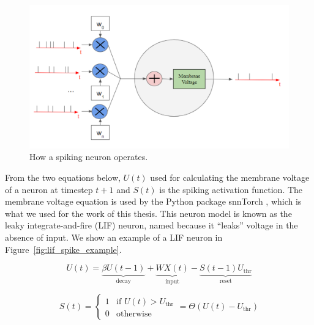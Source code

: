 \documentclass [MS] {UCLAthesis}
\begin{document}
\begin{figure}
    \centering
    \includegraphics[width=\textwidth]{neuron_snn}
    \caption[Spiking neuron model]{How a spiking neuron operates.}
    \label{fig:neuron_snn}
\end{figure}

From the two equations below, $U(t)$ used for calculating the membrane voltage of a neuron at timestep $t+1$ and $S(t)$ is the spiking activation function. The membrane voltage equation is used by the Python package snnTorch \citep{snnTorch}, which is what we used for the work of this thesis. This neuron model is known as the leaky integrate-and-fire (LIF) neuron, named because it ``leaks'' voltage in the absence of input. We show an example of a LIF neuron in Figure~\ref{fig:lif_spike_example}. 

$$ U(t) = \underbrace{\beta U(t-1)}_{\text{decay}}
+ \underbrace{W X(t)}_{\text{input}}
- \underbrace{S(t-1)U_\text{thr}}_{\text{reset}} 
$$

$$
S(t) = \begin{cases} 
      1 & \text{if } U(t) > U_\text{thr} \\
      0 & \text{otherwise }
      \end{cases}
      = \Theta (U(t) - U_\text{thr})
$$
\end{document}
